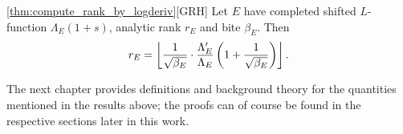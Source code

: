 \begin{quotedtheorem}{\ref{thm:compute_rank_by_logderiv}}[GRH]
Let $E$ have completed shifted $L$-function $\Lambda_E(1+s)$, analytic rank $r_E$ and bite $\beta_E$. Then
\begin{equation}
r_E = \left\lfloor\frac{1}{\sqrt{\beta_E}}\cdot \frac{\Lambda_E^{\prime}}{\Lambda_E}\left(1+\frac{1}{\sqrt{\beta_E}}\right)\right\rfloor.
\end{equation}
\end{quotedtheorem}

The next chapter provides definitions and background theory for the quantities mentioned in the results above; the proofs can of course be found in the respective sections later in this work.

